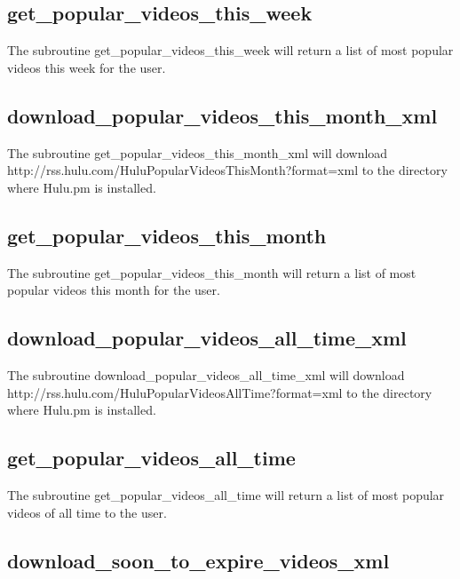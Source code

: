 \subsection*{get\_popular\_videos\_this\_week\label{get_popular_videos_this_week}}


The subroutine get\_popular\_videos\_this\_week will return a list of most popular videos this week for the user.

\subsection*{download\_popular\_videos\_this\_month\_xml\label{download_popular_videos_this_month_xml}}


The subroutine get\_popular\_videos\_this\_month\_xml will download http://rss.hulu.com/HuluPopularVideosThisMonth?format=xml
to the directory where Hulu.pm is installed.

\subsection*{get\_popular\_videos\_this\_month\label{get_popular_videos_this_month}}


The subroutine get\_popular\_videos\_this\_month will return a list of most popular videos this month for the user.

\subsection*{download\_popular\_videos\_all\_time\_xml\label{download_popular_videos_all_time_xml}}


The subroutine download\_popular\_videos\_all\_time\_xml will download http://rss.hulu.com/HuluPopularVideosAllTime?format=xml
to the directory where Hulu.pm is installed.

\subsection*{get\_popular\_videos\_all\_time\label{get_popular_videos_all_time}}


The subroutine get\_popular\_videos\_all\_time will return a list of most popular videos of all time to the user.

\subsection*{download\_soon\_to\_expire\_videos\_xml\label{download_soon_to_expire_videos_xml}}


